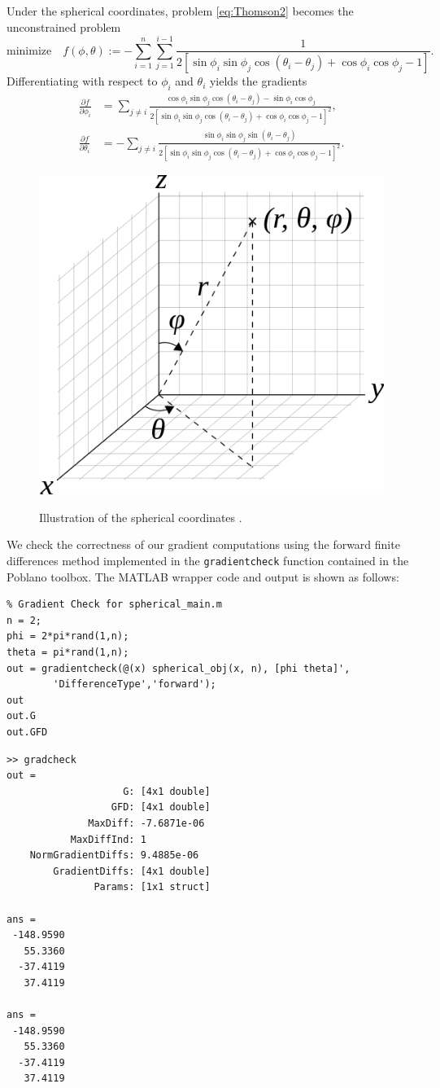 \documentclass[11pt]{article}
\begin{document}
Under the spherical coordinates, problem \eqref{eq:Thomson2} becomes the unconstrained problem
\begin{equation}\label{eq:Sphere}
\text{minimize}\quad f(\phi, \theta) := -\sum_{i=1}^n\sum_{j=1}^{i-1}\frac{1}{2[\sin\phi_i\sin\phi_j\cos(\theta_i-\theta_j) + \cos\phi_i\cos\phi_j-1]}.
\end{equation}
Differentiating with respect to $\phi_i$ and $\theta_i$ yields the gradients
\begin{align}
\frac{\partial f}{\partial \phi_i} & = \sum_{j\neq i}\frac{\cos\phi_i\sin\phi_j\cos(\theta_i-\theta_j)-\sin\phi_i\cos\phi_j}{2[\sin\phi_i\sin\phi_j\cos(\theta_i-\theta_j) + \cos\phi_i\cos\phi_j-1]^2}, \\
\frac{\partial f}{\partial \theta_i} & = -\sum_{j\neq i}\frac{\sin\phi_i\sin\phi_j\sin(\theta_i-\theta_j)}{2[\sin\phi_i\sin\phi_j\cos(\theta_i-\theta_j) + \cos\phi_i\cos\phi_j-1]^2}.
\end{align} 

\begin{figure}[!htb]
  \centering
  \includegraphics[width=0.3\columnwidth]{Spherical}\\
  \caption{Illustration of the spherical coordinates \cite{WikiSphere}.}
  \label{fig:Spherical}
\end{figure}

We check the correctness of our gradient computations using the forward finite differences method implemented in the \texttt{gradientcheck} function contained in the Poblano toolbox. The MATLAB wrapper code and output is shown as follows:

\begin{lstlisting}
% Gradient Check for spherical_main.m
n = 2;
phi = 2*pi*rand(1,n);
theta = pi*rand(1,n);
out = gradientcheck(@(x) spherical_obj(x, n), [phi theta]',
		'DifferenceType','forward');
out
out.G
out.GFD
\end{lstlisting}

\begin{verbatim}
>> gradcheck
out = 
                    G: [4x1 double]
                  GFD: [4x1 double]
              MaxDiff: -7.6871e-06
           MaxDiffInd: 1
    NormGradientDiffs: 9.4885e-06
        GradientDiffs: [4x1 double]
               Params: [1x1 struct]

ans =
 -148.9590
   55.3360
  -37.4119
   37.4119

ans =
 -148.9590
   55.3360
  -37.4119
   37.4119
\end{verbatim}
\end{document}
